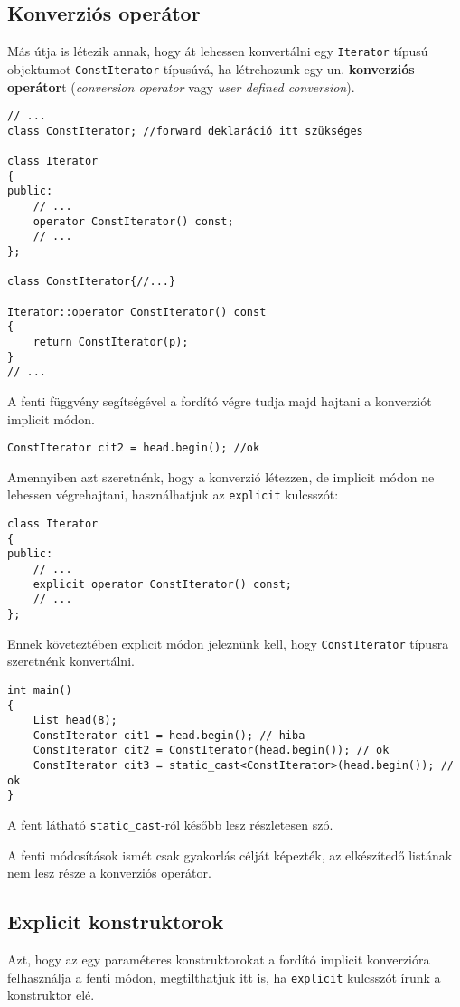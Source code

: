 \documentclass[a4paper,11.5pt,table]{article}
\begin{document}
	\subsection{Konverziós operátor}
	Más útja is létezik annak, hogy át lehessen konvertálni egy \texttt{Iterator} típusú objektumot \texttt{ConstIterator} típusúvá, ha létrehozunk egy un. \textbf{konverziós operátor}t (\textit{conversion operator} vagy \textit{user defined conversion}). 
	\begin{lstlisting}
// ...
class ConstIterator; //forward deklaráció itt szükséges

class Iterator
{
public:
	// ...
	operator ConstIterator() const;
	// ...
};

class ConstIterator{//...}

Iterator::operator ConstIterator() const
{
	return ConstIterator(p);
}
// ...
	\end{lstlisting}
	A fenti függvény segítségével a fordító végre tudja majd hajtani a konverziót implicit módon. 
	\begin{lstlisting}
ConstIterator cit2 = head.begin(); //ok
	\end{lstlisting}	
	Amennyiben azt szeretnénk, hogy a konverzió létezzen, de implicit módon ne lehessen végrehajtani, használhatjuk az \texttt{explicit} kulcsszót:
	\begin{lstlisting}
class Iterator
{
public:
	// ...
	explicit operator ConstIterator() const;
	// ...
};
	\end{lstlisting}
	Ennek követeztében explicit módon jeleznünk kell, hogy \texttt{ConstIterator} típusra szeretnénk konvertálni.
	\begin{lstlisting}
int main()
{
	List head(8);
	ConstIterator cit1 = head.begin(); // hiba
	ConstIterator cit2 = ConstIterator(head.begin()); // ok
	ConstIterator cit3 = static_cast<ConstIterator>(head.begin()); // ok
}
	\end{lstlisting}
	\begin{note}
		A fent látható \texttt{static\_cast}-ról később lesz részletesen szó.
	\end{note}
	\begin{note}
		A fenti módosítások ismét csak gyakorlás célját képezték, az elkészítedő listának nem lesz része a konverziós operátor.
	\end{note}
	\subsection{Explicit konstruktorok}
	Azt, hogy az egy paraméteres konstruktorokat a fordító implicit konverzióra felhasználja a fenti módon, megtilthatjuk itt is, ha \texttt{explicit} kulcsszót írunk a konstruktor elé.
	
\end{document}
